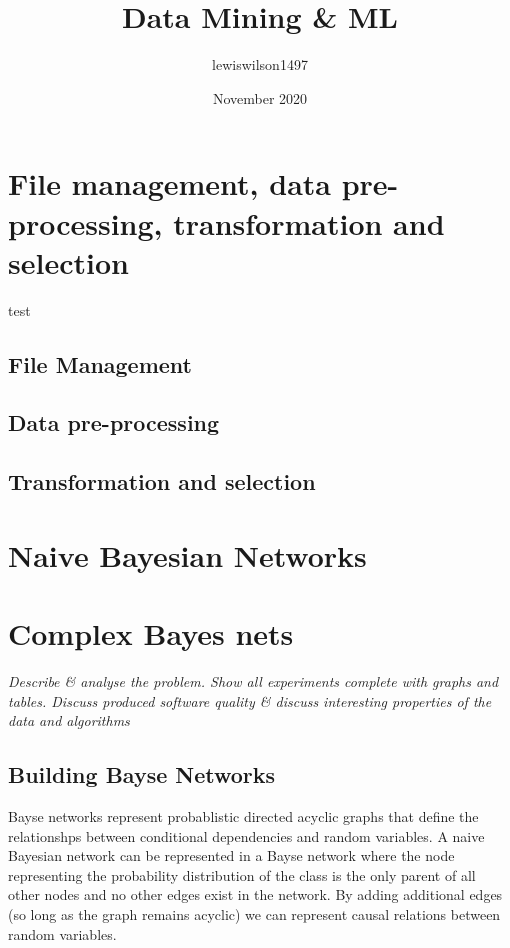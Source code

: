 \documentclass[11pt]{article}
\title{Data Mining \& ML}
\author{lewiswilson1497 }
\date{November 2020}
\begin{document}
\maketitle

\pagebreak

\tableofcontents
\thispagestyle{empty}
\pagebreak
\setcounter{page}{1}

\pagebreak


\section{File management, data pre-processing, transformation and selection}

test

\subsection{File Management}

\subsection{Data pre-processing}

\subsection{Transformation and selection}\label{sec:transSel}


\pagebreak

\section{Naive Bayesian Networks}

\pagebreak

\section{Complex Bayes nets}
\emph{Describe \& analyse the problem. Show all experiments complete with graphs and tables. Discuss produced software quality \& discuss interesting properties of the data and algorithms}

\subsection{Building Bayse Networks}
Bayse networks represent probablistic directed acyclic graphs that define the relationshps between conditional dependencies and random variables. 
A naive Bayesian network can be represented in a Bayse network where the node representing the probability distribution of the class is the only parent of all other nodes and no other edges exist in the network. 
By adding additional edges (so long as the graph remains acyclic) we can represent causal relations between random variables.
\end{document}
